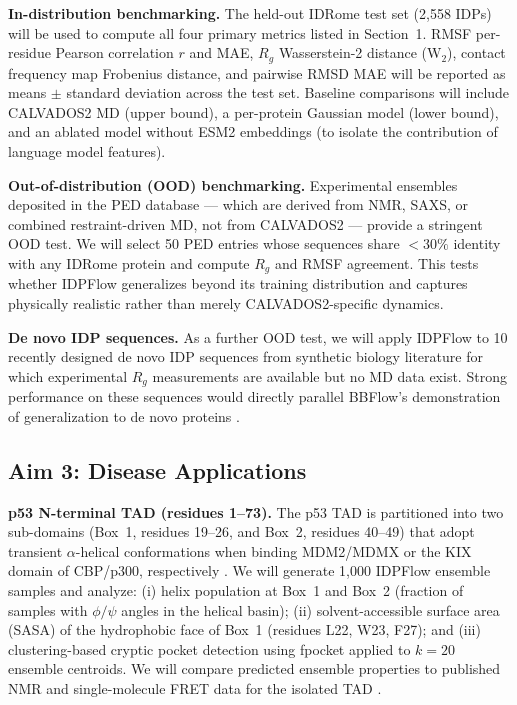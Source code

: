 \documentclass[12pt]{article}
\begin{document}
\noindent\textbf{In-distribution benchmarking.}
The held-out IDRome test set (2,558 IDPs) will be used to compute all four primary metrics
listed in Section~1.
RMSF per-residue Pearson correlation $r$ and MAE, $R_g$ Wasserstein-2 distance (W$_2$),
contact frequency map Frobenius distance, and pairwise RMSD MAE will be reported as means
$\pm$ standard deviation across the test set.
Baseline comparisons will include CALVADOS2 MD (upper bound), a per-protein Gaussian model
(lower bound), and an ablated model without ESM2 embeddings (to isolate the contribution of
language model features).

\noindent\textbf{Out-of-distribution (OOD) benchmarking.}
Experimental ensembles deposited in the PED database \cite{lazar2021ped} --- which are
derived from NMR, SAXS, or combined restraint-driven MD, not from CALVADOS2 --- provide
a stringent OOD test.
We will select 50 PED entries whose sequences share $<30\%$ identity with any IDRome
protein and compute $R_g$ and RMSF agreement.
This tests whether IDPFlow generalizes beyond its training distribution and captures
physically realistic rather than merely CALVADOS2-specific dynamics.

\noindent\textbf{De novo IDP sequences.}
As a further OOD test, we will apply IDPFlow to 10 recently designed de novo IDP sequences
from synthetic biology literature for which experimental $R_g$ measurements are available
but no MD data exist.
Strong performance on these sequences would directly parallel BBFlow's demonstration of
generalization to de novo proteins \cite{wolf2025bbflow}.

\subsection{Aim 3: Disease Applications}

\noindent\textbf{p53 N-terminal TAD (residues 1--73).}
The p53 TAD is partitioned into two sub-domains (Box~1, residues 19--26, and Box~2, residues
40--49) that adopt transient $\alpha$-helical conformations when binding MDM2/MDMX or the
KIX domain of CBP/p300, respectively \cite{raj2022p53}.
We will generate 1,000 IDPFlow ensemble samples and analyze: (i) helix population at Box~1
and Box~2 (fraction of samples with $\phi/\psi$ angles in the helical basin); (ii)
solvent-accessible surface area (SASA) of the hydrophobic face of Box~1 (residues
L22, W23, F27); and (iii) clustering-based cryptic pocket detection using fpocket
\cite{le2009fpocket} applied to $k=20$ ensemble centroids.
We will compare predicted ensemble properties to published NMR and single-molecule FRET data
for the isolated TAD \cite{lee2000p53}.
\end{document}
